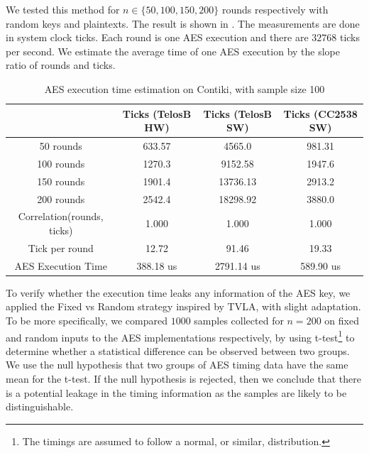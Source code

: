 We tested this method for  $n \in \{ 50, 100, 150, 200\}$ rounds respectively with random keys and plaintexts. The result is shown in . The measurements are done in system clock ticks. Each round is one AES execution and there are $32768$ ticks per second. We estimate the average time of one AES execution by the slope ratio of rounds and ticks.

\begin{table}[ht!]
	\center
	\begin{tabular}{|c|c|c|c|}
	\hline
	                               & Ticks (TelosB HW) & Ticks (TelosB SW) & Ticks (CC2538 SW) \\ \hline
	50 rounds                      & 633.57                  & 4565.0                  & 981.31                  \\ \hline
	100 rounds                     & 1270.3                  & 9152.58                 & 1947.6                  \\ \hline
	150 rounds                     & 1901.4                  & 13736.13                & 2913.2                  \\ \hline
	200 rounds                     & 2542.4                  & 18298.92                & 3880.0                  \\ \hline
	Correlation(rounds, ticks)     & 1.000                   & 1.000                   & 1.000                   \\ \hline
        Tick per round & 12.72                   & 91.46                   & 19.33                   \\ \hline
	AES Execution Time   & 388.18 us               & 2791.14 us              & 589.90 us               \\ \hline
	\end{tabular}
	\caption{AES execution time estimation on Contiki, with sample size 100}
	\label{Tbl: AES execution time estimation of Contiki}
\end{table}

To verify whether the execution time leaks any information of the AES key, we applied the Fixed vs Random strategy inspired by TVLA\cite{TVLA}, with slight adaptation. To be more specifically, we compared $1000$ samples collected for $n=200$ on fixed and random inputs to the AES implementations respectively, by using t-test\footnote{The timings are assumed to follow a normal, or similar, distribution.} to determine whether a statistical difference can be observed  between two groups. We use the null hypothesis that two groups of AES timing data have the same mean for the t-test. If the null hypothesis is rejected, then we conclude that there is a potential leakage in the timing information as the samples are likely to be distinguishable. 

